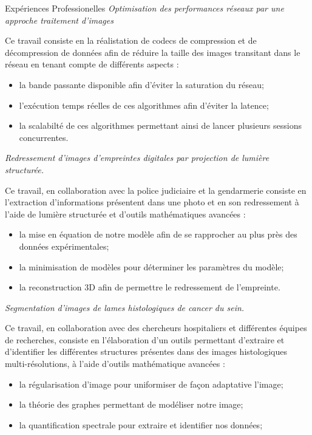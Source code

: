 \begin{rubric}{Expériences Professionelles}
\entry*[2011-]
\textit{Optimisation des performances réseaux par une approche traitement d'images}
\par Ce travail consiste en la réalistation de codecs de compression et de décompression de données
afin de réduire la taille des images transitant dans le réseau en tenant compte de différents aspects :
\begin{itemize}
\item la bande passante disponible afin d'éviter la saturation du réseau;
\item l'exécution temps réelles de ces algorithmes afin d'éviter la latence;  
\item la scalabilté de ces algorithmes permettant ainsi de lancer plusieurs sessions concurrentes.
\end{itemize}

\entry*[2010-2011]
\textit{Redressement d'images d'empreintes digitales par projection de lumière structurée.}
\par Ce travail, en collaboration avec la police judiciaire et la gendarmerie consiste 
en l'extraction d'informations présentent dans une photo et en son redressement à l'aide de lumière structurée et d'outils mathématiques avancées : 
\begin{itemize}
\item la mise en équation de notre modèle afin de se rapprocher au plus près des données expérimentales;
\item la minimisation de modèles pour déterminer les paramètres du modèle;
\item la reconstruction 3D afin de permettre le redressement de l'empreinte.
\end{itemize}
\entry*[2009-2010]
\textit{Segmentation d'images de lames histologiques de cancer du sein.}
\par Ce travail, en collaboration avec des chercheurs hospitaliers et différentes équipes de recherches,
consiste en l'élaboration d'un outils permettant d'extraire et d'identifier les différentes structures 
présentes dans des images histologiques multi-résolutions, à l'aide d'outils mathématique avancées :
\begin{itemize}
\item la régularisation d'image pour uniformiser de façon adaptative l'image;
\item la théorie des graphes permettant de modéliser notre image;
\item la quantification spectrale pour extraire et identifier nos données;
\end{itemize} 


\end{rubric}
